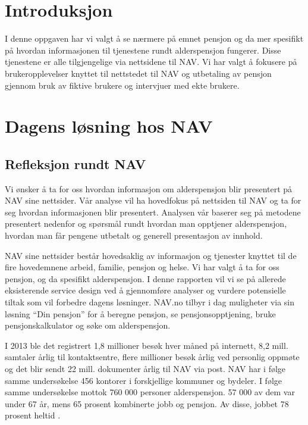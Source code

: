 \documentclass[informationsecurity]{gucmasterproject}
\begin{document}
\tableofcontents


 \chapter{Introduksjon}
I denne oppgaven har vi valgt å se nærmere på emnet pensjon og da mer spesifikt på hvordan informasjonen til tjenestene rundt alderspensjon fungerer. Disse tjenestene er alle tilgjengelige via nettsidene til NAV. Vi har valgt å fokusere på brukeropplevelser knyttet til nettstedet til NAV og utbetaling av pensjon gjennom bruk av fiktive brukere og intervjuer med ekte brukere. 


\chapter{Dagens løsning hos NAV}
\section{Refleksjon rundt NAV}
Vi ønsker å ta for oss hvordan informasjon om alderspensjon blir presentert på NAV sine nettsider. Vår analyse vil ha hovedfokus på nettsiden til NAV og ta for seg hvordan informasjonen blir presentert. Analysen vår baserer seg på metodene presentert nedenfor og spørsmål rundt hvordan man opptjener alderspensjon, hvordan man får pengene utbetalt og generell presentasjon av innhold.

NAV sine nettsider består hovedsaklig av informasjon og tjenester knyttet til de fire hovedemnene arbeid, familie, pensjon og helse. Vi har valgt å ta for oss pensjon, og da spesifikt alderspensjon. I denne rapporten vil vi se på allerede eksisterende service design ved å gjennomføre analyser og vurdere potensielle tiltak som vil forbedre dagens løsninger. NAV.no tilbyr i dag muligheter via sin løsning “Din pensjon” for å beregne pensjon, se pensjonsopptjening, bruke pensjonskalkulator og søke om alderspensjon.

I 2013 ble det registrert 1,8 millioner besøk hver måned på internett, 8,2 mill. samtaler årlig til kontaktsentre, flere millioner besøk årlig ved personlig oppmøte og det blir sendt 22 mill. dokumenter årlig til NAV via post. NAV har i følge samme undersøkelse 456 kontorer i forskjellige kommuner og bydeler. I følge samme undersøkelse mottok 760 000 personer alderspensjon. 57 000 av dem var under 67 år, mens 65 prosent kombinerte jobb og pensjon. Av disse, jobbet 78 prosent heltid \cite{faktaogtall}.
\end{document}
